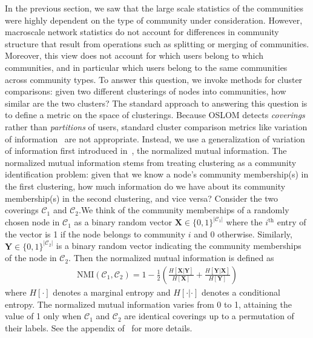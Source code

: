 In the previous section, we saw that the large scale statistics of the communities were highly dependent on the type of community under consideration. However, macroscale network statistics do not account for differences in community structure that result from operations such as splitting or merging of communities. Moreover, this view does not account for which users belong to which communities, and in particular which users belong to the same communities across community types. To answer this question, we invoke methods for cluster comparisons: given two different clusterings of nodes into communities, how similar are the two clusters? The standard approach to answering this question is to define a metric on the space of clusterings.  Because OSLOM detects \emph{coverings} rather than \emph{partitions} of users, standard cluster comparison metrics like variation of information~\cite{meilua2003comparing} are not appropriate. Instead, we use a generalization of variation of information first introduced in~\cite{lancichinetti2009detecting}, the normalized mutual information. The normalized mutual information stems from treating clustering as a community identification problem: given that we know a node's community membership(s) in the first clustering, how much information do we have about its community membership(s) in the second clustering, and vice versa? Consider the two coverings $\mathcal{C}_{1}$ and $\mathcal{C}_{2}.$We think of the community memberships of a randomly chosen node in $\mathcal{C}_{1}$ as a binary random vector $\mathbf{X} \in \{0, 1\}^{|\mathcal{C}_{1}|}$ where the $i^{\text{th}}$ entry of the vector is 1 if the node belongs to community $i$ and 0 otherwise. Similarly, $\mathbf{Y} \in \{ 0, 1\}^{|\mathcal{C}_{2}|}$ is a binary random vector indicating the community memberships of the node in $\mathcal{C}_{2}$. Then the normalized mutual information is defined as
\begin{align}
	\text{NMI}(\mathcal{C}_{1}, \mathcal{C}_{2}) = 1 - \frac{1}{2} \left( \frac{H[\mathbf{X} | \mathbf{Y}]}{H[\mathbf{X}]} + \frac{H[\mathbf{Y} | \mathbf{X}]}{H[\mathbf{Y}]}\right)
\end{align}
where $H[\cdot]$ denotes a marginal entropy and $H[\cdot | \cdot]$ denotes a conditional entropy. The normalized mutual information varies from 0 to 1, attaining the value of 1 only when $\mathcal{C}_{1}$ and $\mathcal{C}_{2}$ are identical coverings up to a permutation of their labels. See the appendix of~\cite{lancichinetti2009detecting} for more details.

